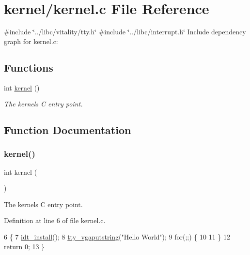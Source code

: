 \hypertarget{a00014}{}\section{kernel/kernel.c File Reference}
\label{a00014}
{\ttfamily \#include \char`\"{}../libc/vitality/tty.\+h\char`\"{}}\newline
{\ttfamily \#include \char`\"{}../libc/interrupt.\+h\char`\"{}}\newline
Include dependency graph for kernel.\+c\+:
\subsection*{Functions}
\begin{DoxyCompactItemize}
\item 
int \hyperlink{a00014_a4ee3d1f05046b7afc6b4d516bf10667a_a4ee3d1f05046b7afc6b4d516bf10667a}{kernel} ()
\begin{DoxyCompactList}\small\item\em The kernels C entry point. \end{DoxyCompactList}\end{DoxyCompactItemize}


\subsection{Function Documentation}
\mbox{\label{a00014_a4ee3d1f05046b7afc6b4d516bf10667a_a4ee3d1f05046b7afc6b4d516bf10667a}} 
\subsubsection{\texorpdfstring{kernel()}{kernel()}}
{\footnotesize\ttfamily int kernel (\begin{DoxyParamCaption}{ }\end{DoxyParamCaption})}



The kernels C entry point. 



Definition at line 6 of file kernel.\+c.


\begin{DoxyCode}
6              \{
7     \hyperlink{a00017_a9817da253735954f4767c5ba6155aa0d_a9817da253735954f4767c5ba6155aa0d}{idt\_install}();
8     \hyperlink{a00041_a13ff2c06d56753c5666ca56cb2d81100_a13ff2c06d56753c5666ca56cb2d81100}{tty\_vgaputstring}(\textcolor{stringliteral}{"Hello World"});
9     \textcolor{keywordflow}{for}(;;) \{
10 
11     \}
12     \textcolor{keywordflow}{return} 0;
13 \}
\end{DoxyCode}
